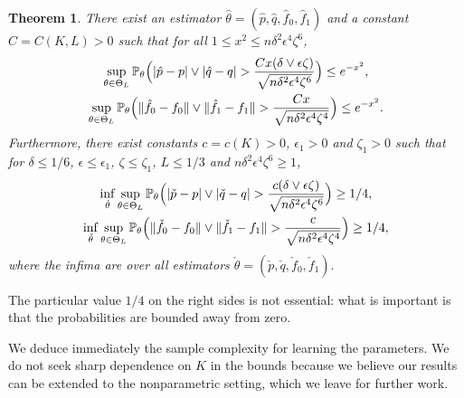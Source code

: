 \documentclass[journal]{IEEEtran}
\newtheorem{theorem}{Theorem}
\newcommand{\1}{\boldsymbol{1}}
\newcommand{\PP}{\mathbb{P}}
\DeclarePairedDelimiter{\brackets}{(}{)}
\DeclarePairedDelimiter{\norm}{\lVert}{\rVert}
\DeclarePairedDelimiter{\abs}{\lvert}{\rvert}
\begin{document}
\begin{theorem}
  \label{cor:rates-for-theta}
  There exist an estimator $\hat{\theta}=(\hat{p},\hat{q},\hat{f}_0,\hat{f}_1)$ and a constant $C=C(K,L)>0$ such that for all $1\leq x^2\leq n\delta^2\epsilon^4\zeta^6$,
  \begin{gather*}
    \sup_{\theta \in \Theta_L} \PP_\theta\brackets[\Big]{\abs{\hat{p}-p} \vee \abs{\hat{q}-q} >\frac{Cx (\delta \vee \epsilon \zeta)}{\sqrt{n\delta^2\epsilon^4\zeta^6}}} \leq  e^{-x^2},\\
    \sup_{\theta\in \Theta_L} \PP_{\theta}\brackets[\Big]{\norm{\hat{f}_0-f_0} \vee \norm{\hat{f}_1-f_1} >\frac{Cx}{\sqrt{n\delta^2\epsilon^4\zeta^4}}} \leq e^{-x^2}.
  \end{gather*}
  Furthermore, there exist constants $c=c(K)>0$, $\epsilon_1 > 0$ and $\zeta_1 >0$  such that for $\delta\leq 1/6$, $\epsilon\leq \epsilon_1$, $\zeta \leq \zeta_1$, $L\leq 1/3$ and $n\delta^2\epsilon^4\zeta^6\geq 1$,
  \begin{gather*}
    \inf_{\check{\theta}}\sup_{\theta \in \Theta_L} \PP_\theta\brackets[\Big]{\abs{\check{p}-p} \vee \abs{\check{q}-q} >\frac{c(\delta \vee \epsilon \zeta)}{\sqrt{n\delta^2\epsilon^4\zeta^6}}}\geq 1/4,\\
    \inf_{\check{\theta}}\sup_{\theta\in \Theta_L} \PP_{\theta}\brackets[\Big]{\norm{\check{f}_0-f_0} \vee \norm{\check{f}_1-f_1}>\frac{c}{\sqrt{n\delta^2\epsilon^4\zeta^4}}} \geq 1/4,
  \end{gather*}
  where the infima are over all estimators $\check{\theta}=(\check{p},\check{q},\check{f}_0,\check{f}_1).$
\end{theorem}
%
The particular value $1/4$ on the right sides is not essential: what is important is that the probabilities are bounded away from zero.

	We deduce immediately the sample complexity for learning the parameters. %
	We do not seek sharp dependence on $K$ in the bounds because we believe our results can be extended to the nonparametric setting, which we leave for further work. %
\end{document}
